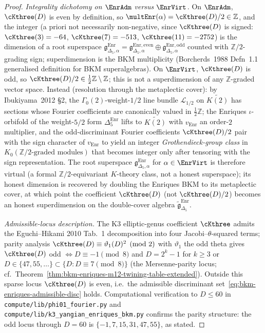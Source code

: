 \begin{proof}[Proof]
\emph{Integrality dichotomy on $\EnrAdm$ versus $\EnrVirt$.}
On $\EnrAdm$, $\cKthree(D)$ is even by definition, so
$\multEnr(\alpha) = \cKthree(D)/2\in\mathbb{Z}$, and the integer (a
priori not necessarily non-negative, since $\cKthree(D)$ is signed:
$\cKthree(3) = -64$, $\cKthree(7) = -513$, $\cKthree(11) = -2752$)
is the dimension of a root superspace
$\mathfrak{g}_{\Delta_5,\alpha}^{\mathrm{Enr}} =
\mathfrak{g}_{\Delta_5,\alpha}^{\mathrm{Enr,even}}\oplus
\mathfrak{g}_{\Delta_5,\alpha}^{\mathrm{Enr,odd}}$ counted with
$\mathbb{Z}/2$-grading sign; superdimension is the BKM
multiplicity (Borcherds~1988 Defn~1.1 generalised definition for
BKM superalgebras). On $\EnrVirt$, $\cKthree(D)$ is odd, so
$\cKthree(D)/2\in\tfrac{1}{2}\mathbb{Z}\setminus\mathbb{Z}$; this
is not a superdimension of any $\mathbb{Z}$-graded vector space.
Instead (resolution through the metaplectic cover):
by Ibukiyama~2012 \S 2, the $\Gamma_0(2)$-weight-$1/2$ line bundle
$\mathcal{L}_{1/2}$ on $\widetilde{K(2)}$ has sections whose Fourier
coefficients are canonically valued in $\tfrac{1}{2}\mathbb{Z}$;
the Enriques $\iota$-orbifold of the weight-$5/2$ form
$\Delta_5^{\mathrm{Enr}}$ lifts to $\widetilde{K(2)}$ with $v_{\mathrm{Enr}}$
an order-$2$ multiplier, and the odd-discriminant Fourier
coefficients $\cKthree(D)/2$ pair with the sign character of
$v_{\mathrm{Enr}}$ to yield an integer \emph{Grothendieck-group
class} in $K_0(\mathbb{Z}/2\text{-graded modules})$ that becomes
integer only after tensoring with the sign representation. The
root superspace $\mathfrak{g}_{\Delta_5,\alpha}^{\mathrm{Enr}}$ for
$\alpha\in\EnrVirt$ is therefore virtual (a formal
$\mathbb{Z}/2$-equivariant $K$-theory class, not a honest
superspace); its honest dimension is recovered by doubling the
Enriques BKM to its metaplectic cover, at which point the coefficient
$\cKthree(D)$ (not $\cKthree(D)/2$) becomes an honest superdimension
on the double-cover algebra $\tilde{\mathfrak{g}}_{\Delta_5}^{\mathrm{Enr}}$.

\emph{Admissible-locus description.}
The K3 elliptic-genus coefficient $\cKthree$ admits the
Eguchi--Hikami 2010 Tab.~1 decomposition into four
Jacobi--$\theta$-squared terms; parity analysis
$\cKthree(D) \equiv \vartheta_1(D)^2\pmod 2$ with $\vartheta_1$ the
odd theta gives $\cKthree(D)$ odd $\iff D\equiv -1\pmod 8$ and
$D = 2^{k}-1$ for $k\geq 3$ or $D \in\{47, 55, \ldots\}\subset\{D : D\equiv
7\pmod 8\}$ (the Mersenne-parity locus; cf.\
Theorem~\ref{thm:bkm-enriques-m12-twining-table-extended}). Outside
this sparse locus $\cKthree(D)$ is even, i.e.\ the admissible
discriminant set~\eqref{eq:bkm-enriques-admissible-disc} holds.
Computational verification to $D\leq 60$ in
\texttt{compute/lib/phi01\_fourier.py} and
\texttt{compute/lib/k3\_yangian\_enriques\_bkm.py} confirms the
parity structure: the odd locus through $D=60$ is
$\{-1, 7, 15, 31, 47, 55\}$, as stated.


\end{proof}
